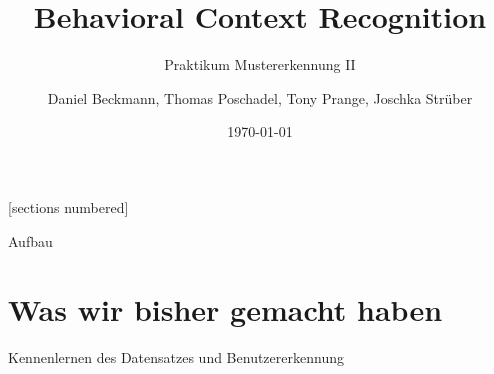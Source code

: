 \documentclass[10pt,%
	wide,%
	xcolor={x11names},%
	hyperref={colorlinks},%
	pantone312,%
	handout,%
	]{beamer}
\author{Daniel Beckmann, Thomas Poschadel, Tony Prange, Joschka Strüber}
\title{Behavioral Context Recognition}
\subtitle{Praktikum Mustererkennung II}
\date{\today}
\begin{document}
[sections numbered]

\begin{frame}[plain]
  \maketitle
\end{frame}

\begin{frame}[t]{Aufbau}
\end{frame}

\section{Was wir bisher gemacht haben}

\begin{frame}[t]{Kennenlernen des Datensatzes und Benutzererkennung}

\end{frame}
\end{document}
